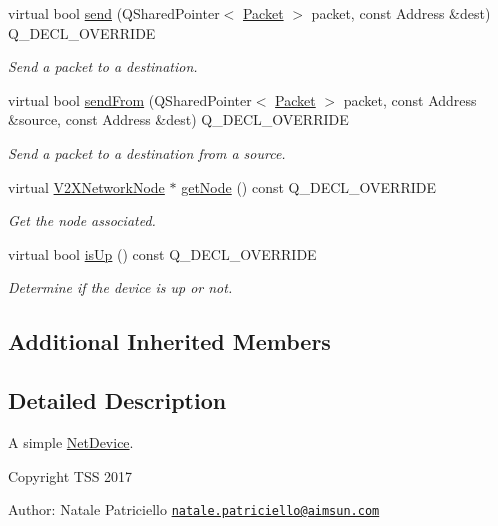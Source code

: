 \begin{DoxyCompactItemize}
virtual bool \hyperlink{classSimpleNetDevice_afa5565402ab4df3f09a78d9cf7ee9143}{send} (Q\+Shared\+Pointer$<$ \hyperlink{group__V2XFramework_ga1b82bfc289dbcb9aced56200d7abc964}{Packet} $>$ packet, const Address \&dest) Q\+\_\+\+D\+E\+C\+L\+\_\+\+O\+V\+E\+R\+R\+I\+DE
\begin{DoxyCompactList}\small\item\em Send a packet to a destination. \end{DoxyCompactList}\item 
virtual bool \hyperlink{classSimpleNetDevice_a2ca62c834e4940132b8003218309ec06}{send\+From} (Q\+Shared\+Pointer$<$ \hyperlink{group__V2XFramework_ga1b82bfc289dbcb9aced56200d7abc964}{Packet} $>$ packet, const Address \&source, const Address \&dest) Q\+\_\+\+D\+E\+C\+L\+\_\+\+O\+V\+E\+R\+R\+I\+DE
\begin{DoxyCompactList}\small\item\em Send a packet to a destination from a source. \end{DoxyCompactList}\item 
virtual \hyperlink{classV2XNetworkNode}{V2\+X\+Network\+Node} $\ast$ \hyperlink{classSimpleNetDevice_a1e7e40ef64fb3f057f6b4a2df054cad2}{get\+Node} () const Q\+\_\+\+D\+E\+C\+L\+\_\+\+O\+V\+E\+R\+R\+I\+DE
\begin{DoxyCompactList}\small\item\em Get the node associated. \end{DoxyCompactList}\item 
virtual bool \hyperlink{classSimpleNetDevice_a39e6c1c9de73f5c3a6d358a20d54b3c7}{is\+Up} () const Q\+\_\+\+D\+E\+C\+L\+\_\+\+O\+V\+E\+R\+R\+I\+DE
\begin{DoxyCompactList}\small\item\em Determine if the device is up or not. \end{DoxyCompactList}\end{DoxyCompactItemize}
\subsection*{Additional Inherited Members}


\subsection{Detailed Description}
A simple \hyperlink{classNetDevice}{Net\+Device}. 

Copyright T\+SS 2017

Author\+: Natale Patriciello \href{mailto:natale.patriciello@aimsun.com}{\tt natale.\+patriciello@aimsun.\+com}

